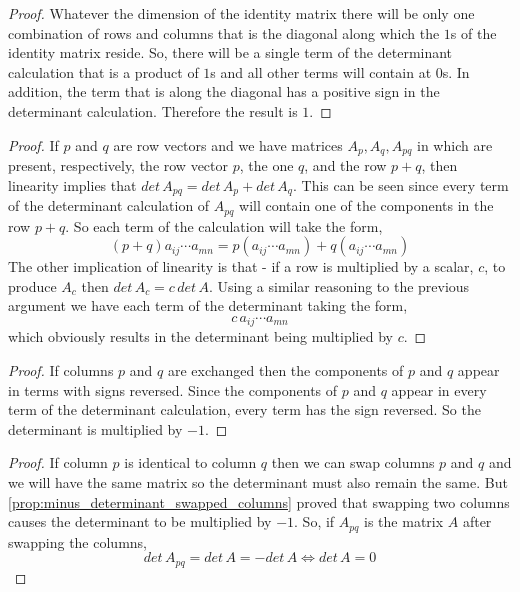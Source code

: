 \documentclass[MathsNotesBase.tex]{subfiles}
\begin{document}
{		
		\begin{proof}
		Whatever the dimension of the identity matrix there will be only one combination of rows and columns that is the diagonal along which the $1$s of the identity matrix reside. So, there will be a single term of the determinant calculation that is a product of $1$s and all other terms will contain at $0$s. In addition, the term that is along the diagonal has a positive sign in the determinant calculation. Therefore the result is $1$.         
		\end{proof}
		
		\begin{proof}
		If $p$ and $q$ are row vectors and we have matrices $A_p, A_q, A_{pq}$ in which are present, respectively, the row vector $p$, the one $q$, and the row $p + q$, then linearity implies that $det\, A_{pq} = det\, A_{p} + det\, A_{q}$. This can be seen since every term of the determinant calculation of $A_{pq}$ will contain one of the components in the row $p+q$. So each term of the calculation will take the form,
		\[ (p + q)a_{ij}\cdots a_{mn} = p(a_{ij}\cdots a_{mn}) + q(a_{ij}\cdots a_{mn}) \]
		The other implication of linearity is that - if a row is multiplied by a scalar, $c$, to produce $A_c$ then $det\, A_c = c\,det\,A$. Using a similar reasoning to the previous argument we have each term of the determinant taking the form,
		\[ c\,a_{ij}\cdots a_{mn} \]
		which obviously results in the determinant being multiplied by $c$.
		\end{proof}
	
		\begin{proof}
			If columns $p$ and $q$ are exchanged then the components of $p$ and $q$ appear in terms with signs reversed. Since the components of $p$ and $q$ appear in every term of the determinant calculation, every term has the sign reversed. So the determinant is multiplied by $-1$.
		\end{proof}
	
		\begin{proof}
			If column $p$ is identical to column $q$ then we can swap columns $p$ and $q$ and we will have the same matrix so the determinant must also remain the same. But \autoref{prop:minus_determinant_swapped_columns} proved that swapping two columns causes the determinant to be multiplied by $-1$. So, if $A_{pq}$ is the matrix $A$ after swapping the columns,
			\[ det\, A_{pq} = det\,A = -det\,A \iff det\,A = 0 \]
		\end{proof}
	
}
\end{document}
